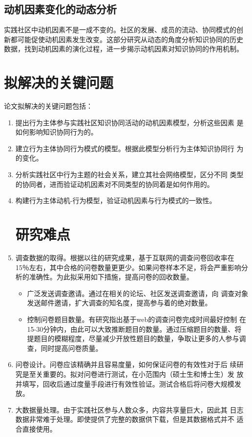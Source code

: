 \documentclass[12pt,a4paper]{ctexart}
\begin{document}
\subsection{动机因素变化的动态分析}
实践社区中动机因素不是一成不变的。社区的发展、成员的流动、协同模式的创
新都可能促使动机因素发生改变。这部分研究从动态的角度分析知识协同的历史
数据，找到动机因素的演化过程，进一步揭示动机因素对知识协同的作用机制。

\section{拟解决的关键问题 }
\label{sec:-}
论文拟解决的关键问题包括：
\begin{enumerate}
\item 提出行为主体参与实践社区知识协同活动的动机因素模型，分析这些因素
  是如何影响知识协同行为的。
\item 建立行为主体协同行为模式的模型。根据此模型分析行为主体知识协同行
  为的变化。
\item  分析实践社区中行为主题的社会关系，建立其社会网络模型，区分不同
  类型的协同者，进而验证动机因素对不同类型的协同着是如何作用的。
\item  构建行为主体动机-行为模型，验证动机因素与行为模式的一致性。




\section{研究难点}
\item 调查数据的取得。根据以往的研究成果，基于互联网的调查问卷回收率在
  15％左右，其中合格的问卷数量更更少。如果问卷样本不足，将会严重影响分
  析的准确性。为此拟采用如下措施，提高问卷的回收数量。
  \begin{itemize}
  \item 广泛发送调查邀请。通过在相关的论坛、社区发送调查邀请，向
    调查对象发送邮件邀请，扩大调查的知名度，提高参与着的绝对数量。
   \item 控制问卷题目数量。有研究指出基于web的调查问卷完成时间最好控制
     在15-30分钟内，由此可以大致推断题目的数量。通过压缩题目的数量、将
     提题目的模糊程度，尽量减少开放性题目的数量，争取让更多的人参与调
     查，同时提高问卷质量。
  \end{itemize}
\item  问卷设计。问卷应该精确并且容易度量，如何保证问卷的有效性对于后
  续研究是至关重要的。拟对问卷进行测试，在小范围内（硕士生和博士生）发
  放并填写，回收后通过度量手段进行有效性验证。测试合格后将问卷大规模发
  放。
\item  大数据量处理。由于实践社区参与人数众多，内容共享量巨大，因此其
  日志数据非常难于处理。即使提供了完整的数据供下载，但是其数据格式并不
  适合直接使用。
\end{enumerate}
\end{document}
